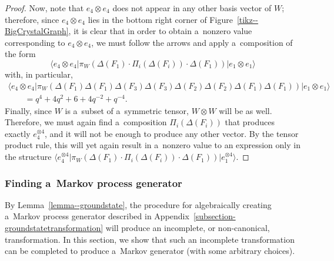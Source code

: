 \documentclass[pdftex]{sigma}
\numberwithin{equation}{section}
\theoremstyle{definition}
\begin{document}
\begin{proof}[Proof]
Now, note that $e_4 \otimes e_4$ does not appear in any other basis vector of $W$; therefore, since $e_4 \otimes e_4$ lies in the bottom right corner of Figure~\ref{tikz--BigCrystalGraph}, it is clear that in order to obtain a~nonzero value corresponding to $e_4 \otimes e_4$, we must follow the arrows and apply a~composition of the form
\[\langle e_4 \otimes e_4| \pi_W(\Delta(F_1) \cdot \Pi_i (\Delta(F_i)) \cdot \Delta(F_1))| e_1 \otimes e_1 \rangle\]
with, in particular,
\begin{gather*}
\langle e_4 \otimes e_4| \pi_W(\Delta(F_1)\Delta(F_1)\Delta(F_3)\Delta(F_3)\Delta(F_2)\Delta(F_2)\Delta(F_1) \Delta(F_1))| e_1 \otimes e_1 \rangle\\
\qquad = q^4 + 4q^2 + 6 + 4q^{-2} + q^{-4}.
\end{gather*}
Finally, since $W$ is a~subset of a~symmetric tensor, $W \otimes W$ will be as well. Therefore, we must again find a~composition $\Pi_i(\Delta (F_i))$ that produces exactly $e_4^{\otimes 4}$, and it will not be enough to produce any other vector. By the tensor product rule, this will yet again result in a~nonzero value to an expression only in the structure $
\big\langle e_4^{\otimes 4}| \pi_W(\Delta(F_1) \cdot \Pi_i (\Delta(F_i)) \cdot \Delta(F_1))| e_1^{\otimes 4}\big\rangle$.
\end{proof}

\subsubsection{Finding a~Markov process generator} \label{section--FindingAlgebraGenerator}

By Lemma~\ref{lemma--groundstate}, the procedure for algebraically creating a~Markov process generator described in Appendix~\ref{subsection-groundstatetransformation} will produce an incomplete, or non-canonical, transformation. In this section, we show that such an incomplete transformation can be completed to produce a~Markov generator (with some arbitrary choices).
\end{document}
